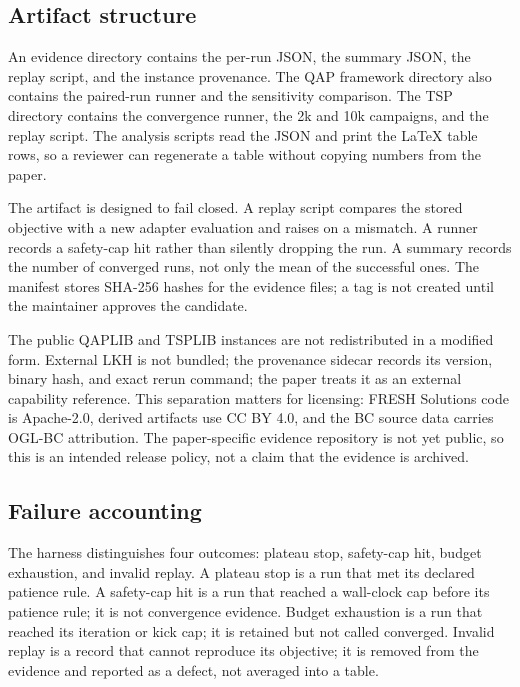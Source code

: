 \documentclass[11pt]{article}
\begin{document}
\subsection{Artifact structure}

An evidence directory contains the per-run JSON, the summary JSON, the replay script, and the
instance provenance. The QAP framework directory also contains the paired-run runner and the
sensitivity comparison. The TSP directory contains the convergence runner, the 2k and 10k campaigns,
and the replay script. The analysis scripts read the JSON and print the LaTeX table rows, so a
reviewer can regenerate a table without copying numbers from the paper.

The artifact is designed to fail closed. A replay script compares the stored objective with a new
adapter evaluation and raises on a mismatch. A runner records a safety-cap hit rather than silently
dropping the run. A summary records the number of converged runs, not only the mean of the successful
ones. The manifest stores SHA-256 hashes for the evidence files; a tag is not created until the
maintainer approves the candidate.

The public QAPLIB and TSPLIB instances are not redistributed in a modified form. External LKH is not bundled; the
provenance sidecar records its version, binary hash, and exact rerun command; the paper treats it as
an external capability reference. This separation matters for licensing: FRESH Solutions code is Apache-2.0, derived artifacts use
CC BY 4.0, and the BC source data carries OGL-BC attribution. The paper-specific evidence repository
is not yet public, so this is an intended release policy, not a claim that the evidence is archived.

\subsection{Failure accounting}

The harness distinguishes four outcomes: plateau stop, safety-cap hit, budget exhaustion, and
invalid replay. A plateau stop is a run that met its declared patience rule. A safety-cap hit is a
run that reached a wall-clock cap before its patience rule; it is not convergence evidence. Budget
exhaustion is a run that reached its iteration or kick cap; it is retained but not called converged.
Invalid replay is a record that cannot reproduce its objective; it is removed from the evidence and
reported as a defect, not averaged into a table.
\end{document}
